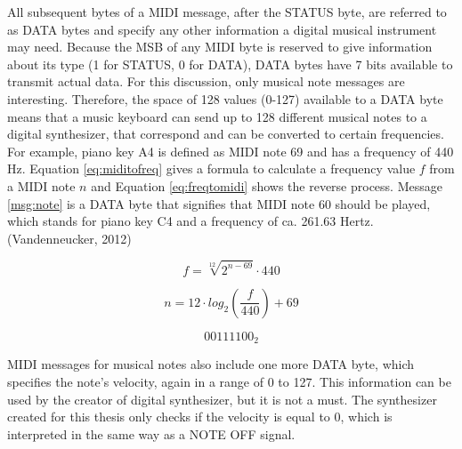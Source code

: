 

\pagebreak

\noindent All subsequent bytes of a MIDI message, after the STATUS byte, are referred to as DATA bytes and specify any other information a digital musical instrument may need. Because the MSB of any MIDI byte is reserved to give information about its type (1 for STATUS, 0 for DATA), DATA bytes have 7 bits available to transmit actual data. For this discussion, only musical note messages are interesting. Therefore, the space of 128 values (0-127) available to a DATA byte means that a music keyboard can send up to 128 different musical notes to a digital synthesizer, that correspond and can be converted to certain frequencies. For example, piano key A4 is defined as MIDI note 69 and has a frequency of 440 Hz. Equation \ref{eq:miditofreq} gives a formula to calculate a frequency value $f$ from a MIDI note $n$ and Equation \ref{eq:freqtomidi} shows the reverse process. Message \ref{msg:note} is a DATA byte that signifies that MIDI note 60 should be played, which stands for piano key C4 and a frequency of ca. 261.63 Hertz. (Vandenneucker, 2012)

\begin{equation}
  f = \sqrt[12]{2^{n-69}} \cdot 440
  \label{eq:miditofreq}
\end{equation}

\begin{equation}
  n = 12 \cdot log_{2}(\frac{f}{440}) + 69
  \label{eq:freqtomidi}
\end{equation}

\begin{equation}
  {00111100}_{2}
  \label{msg:note}
\end{equation}

\noindent MIDI messages for musical notes also include one more DATA byte, which specifies the note's velocity, again in a range of 0 to 127. This information can be used by the creator of digital synthesizer, but it is not a must. The synthesizer created for this thesis only checks if the velocity is equal to 0, which is interpreted in the same way as a NOTE OFF signal.

